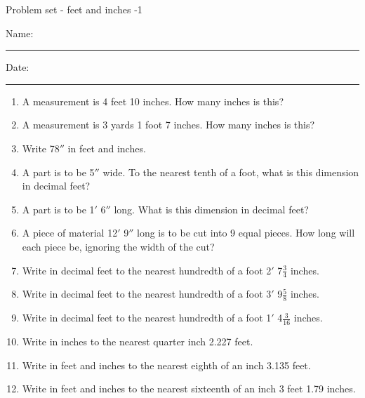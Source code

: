 \documentclass[12pt,fleqn]{article} %
\begin{document}
\pagestyle{empty} %
		\newcommand{\spacing}{\vspace{0.65in}}
\begin{center}
          Problem set - feet and inches -1 \\[0.5in]
\end{center}
  \vspace{0.25in}

Name: \rule{4in}{0.005in} Date: \rule{1.4in}{0.005in} 

\begin{enumerate}

  \item A measurement is 4 feet 10 inches. How many inches is this? 
  \spacing

  \item A measurement is 3 yards 1 foot 7 inches. How many inches is this? 
  \spacing

  \item Write 78$''$ in feet and inches. 
  \spacing

  \item A part is to be 5$''$ wide. To the nearest tenth of a foot, what is this dimension in decimal feet? 
  \spacing

  \item A part is to be 1$'$ 6$''$ long. What is this dimension in decimal feet? 
  \spacing

  \item A piece of material 12$'$ 9$''$ long is to be cut into 9 equal pieces. How long will each piece be, ignoring the width of the cut?
  \spacing

  \item Write in decimal feet to the nearest hundredth of a foot 2$'$ 7$\frac{3}{4}$ inches. 
  \spacing

  \item Write in decimal feet to the nearest hundredth of a foot 3$'$ 9$\frac{5}{8}$ inches. 
  \spacing

  \item Write in decimal feet to the nearest hundredth of a foot 1$'$ 4$\frac{3}{16}$ inches. 
  \spacing

  \item Write in inches to the nearest quarter inch 2.227 feet. 
  \spacing

  \item Write in feet and inches to the nearest eighth of an inch 3.135 feet. 
  \spacing

  \item Write in feet and inches to the nearest sixteenth of an inch 3 feet 1.79 inches. 
  \spacing


\end{enumerate}
\end{document}
